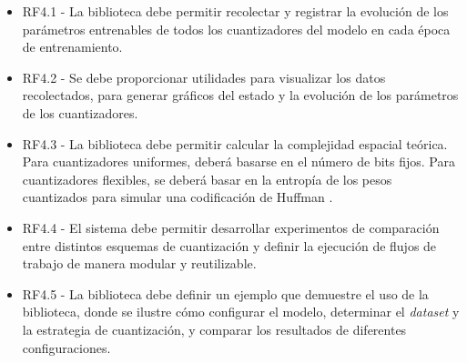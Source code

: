 \begin{itemize}
    \item RF4.1 - La biblioteca debe permitir recolectar y registrar la evolución de los parámetros entrenables de todos los cuantizadores del modelo en cada época de entrenamiento.

    \item RF4.2 - Se debe proporcionar utilidades para visualizar los datos recolectados, para generar gráficos del estado y la evolución de los parámetros de los cuantizadores.

    \item RF4.3 - La biblioteca debe permitir calcular la complejidad espacial teórica. Para cuantizadores uniformes, deberá basarse en el número de bits fijos. Para cuantizadores flexibles, se deberá basar en la entropía de los pesos cuantizados para simular una codificación de Huffman \cite{huffman1952method}.

    \item RF4.4 - El sistema debe permitir desarrollar experimentos de comparación entre distintos esquemas de cuantización y definir la ejecución de flujos de trabajo de manera modular y reutilizable.

    \item RF4.5 - La biblioteca debe definir un ejemplo que demuestre el uso de la biblioteca, donde se ilustre cómo configurar el modelo, determinar el \textit{dataset} y la estrategia de cuantización, y comparar los resultados de diferentes configuraciones.
\end{itemize}
